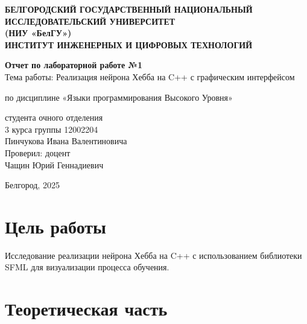 \documentclass{article}
\begin{document}
\begin{center}
    \textbf{\large БЕЛГОРОДСКИЙ ГОСУДАРСТВЕННЫЙ НАЦИОНАЛЬНЫЙ ИССЛЕДОВАТЕЛЬСКИЙ УНИВЕРСИТЕТ} \\
    \textbf{(НИУ «БелГУ»)} \\
    \vspace{1em}
    \textbf{ИНСТИТУТ ИНЖЕНЕРНЫХ И ЦИФРОВЫХ ТЕХНОЛОГИЙ}
\end{center}

\vspace{3em}
\begin{center}
    \textbf{Отчет по лабораторной работе №1} \\
    Тема работы: Реализация нейрона Хебба на C++ с графическим интерфейсом
\end{center}

\vspace{3em}
\begin{center}
    по дисциплине «Языки программирования Высокого Уровня»
\end{center}

\vspace{1em}
\begin{flushright}
    студента очного отделения \\
    3 курса группы 12002204 \\
    Пинчукова Ивана Валентиновича \\
    \vspace{1em}
    Проверил: доцент \\
    Чащин Юрий Геннадиевич
\end{flushright}

\vfill
\begin{center}
    Белгород, 2025
\end{center}

\newpage
\section*{Цель работы}
Исследование реализации нейрона Хебба на C++ с использованием библиотеки SFML для визуализации процесса обучения.

\section*{Теоретическая часть}
\end{document}
